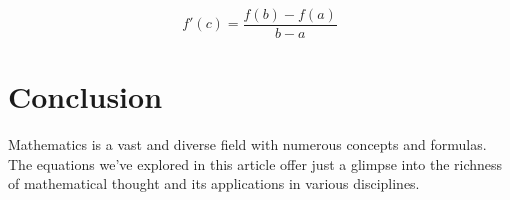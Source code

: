 \documentclass{article}
\begin{document}
\begin{equation}
    f'(c) = \frac{f(b) - f(a)}{b - a}
\end{equation}

\section{Conclusion}
Mathematics is a vast and diverse field with numerous concepts and formulas. The equations we've explored in this article offer just a glimpse into the richness of mathematical thought and its applications in various disciplines.
\end{document}
